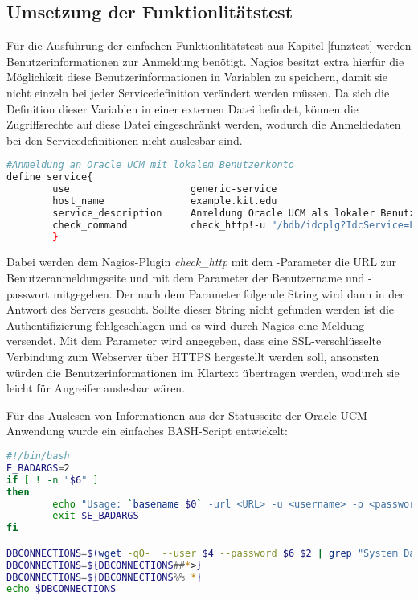 \subsection{Umsetzung der Funktionlitätstest}

Für die Ausführung der einfachen Funktionlitätstest aus Kapitel \ref{funztest} werden Benutzerinformationen zur Anmeldung benötigt.
Nagios besitzt extra hierfür die Möglichkeit diese Benutzerinformationen in Variablen zu speichern, damit sie nicht einzeln bei jeder Servicedefinition verändert werden müssen.
Da sich die Definition dieser Variablen in einer externen Datei befindet, können die Zugriffsrechte auf diese Datei eingeschränkt werden, wodurch die Anmeldedaten bei den Servicedefinitionen nicht auslesbar sind.

\begin{lstlisting}[captionpos=b, caption=Funktionalitätstest der Benutzeranmeldung, label=userauthdef, breaklines = true, language=sh]
#Anmeldung an Oracle UCM mit lokalem Benutzerkonto
define service{
        use                     generic-service
        host_name               example.kit.edu
        service_description     Anmeldung Oracle UCM als lokaler Benutzer
        check_command           check_http!-u "/bdb/idcplg?IdcService=LOGIN&Action=GetTemplatePage&Page=HOME\_PAGE&Auth=Internet"  -a $USER3$:$USER4$ -e "Sie sind angemeldet als" -S
        }
\end{lstlisting}


Dabei werden dem Nagios-Plugin \textit{check\_http} mit dem -Parameter die URL zur Benutzeranmeldungseite und mit dem Parameter  der Benutzername und -passwort mitgegeben.
Der nach dem Parameter  folgende String wird dann in der Antwort des Servers gesucht.
Sollte dieser String nicht gefunden werden ist die Authentifizierung fehlgeschlagen und es wird durch Nagios eine Meldung versendet.
Mit dem Parameter  wird angegeben, dass eine \gls{SSL}-verschlüsselte Verbindung zum Webserver über HTTPS hergestellt werden soll, ansonsten würden die Benutzerinformationen im Klartext übertragen werden, wodurch sie leicht für Angreifer auslesbar wären.

Für das Auslesen von Informationen aus der Statusseite der Oracle UCM-Anwendung wurde ein einfaches BASH-Script entwickelt:

\begin{lstlisting}[captionpos=b, caption=Auslesen der Verbindungen zur Datenbank, label=dbcon, breaklines = true, language=sh]
#!/bin/bash
E_BADARGS=2
if [ ! -n "$6" ]
then
        echo "Usage: `basename $0` -url <URL> -u <username> -p <password>"
        exit $E_BADARGS
fi

DBCONNECTIONS=$(wget -qO-  --user $4 --password $6 $2 | grep "System Database")
DBCONNECTIONS=${DBCONNECTIONS##*>}
DBCONNECTIONS=${DBCONNECTIONS%% *}
echo $DBCONNECTIONS
\end{lstlisting}

